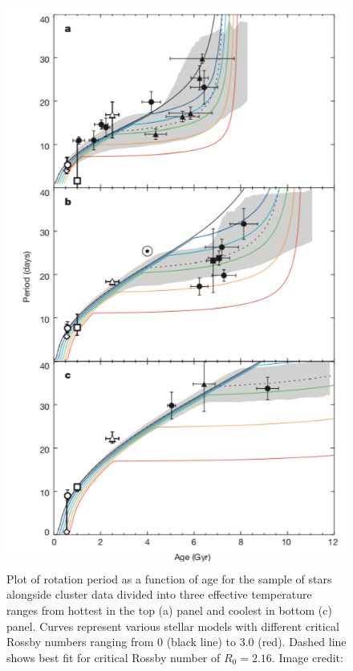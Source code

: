 \begin{figure}[h]
    \centering
    \includegraphics[scale=0.35]{Figures/2-Historical_overview/van_saders_R0_plot.png}
    \caption[Rotation period as a function of age with various stellar models that include a critical Rossby number]{Plot of rotation period as a function of age for the \citet{van_Saders_etal_2016} sample of stars alongside cluster data divided into three effective temperature ranges from hottest in the top (a) panel and coolest in bottom (c) panel. Curves represent various stellar models with different critical Rossby numbers ranging from 0 (black line) to 3.0 (red). Dashed line shows best fit for critical Rossby number of $R_{0} = 2.16$. Image credit: \citet{van_Saders_etal_2016}}
    \label{fig:van_saders_plot_2}
\end{figure}

